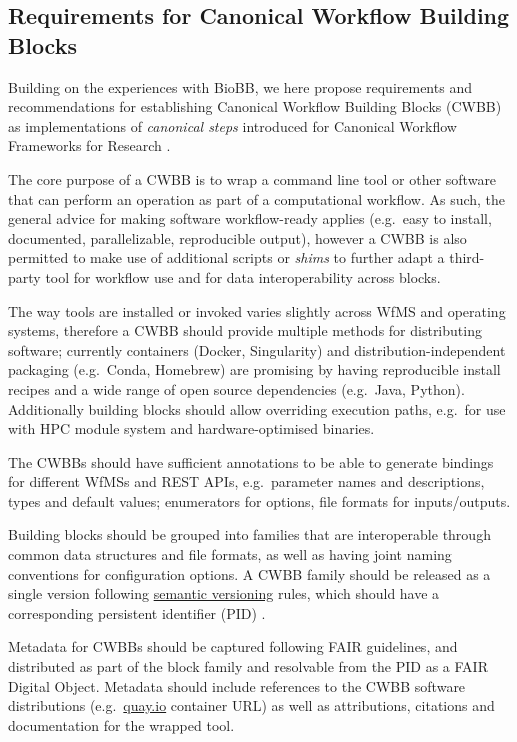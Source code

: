 \hypertarget{requirements-for-canonical-workflow-building-blocks}{%
\subsection{Requirements for Canonical Workflow Building
Blocks}\label{requirements-for-canonical-workflow-building-blocks}}

Building on the experiences with BioBB, we here propose requirements and
recommendations for establishing Canonical Workflow Building Blocks
(CWBB) as implementations of \emph{canonical steps} introduced for
Canonical Workflow Frameworks for Research \cite{ch6-36}.

The core purpose of a CWBB is to wrap a command line tool or other
software that can perform an operation as part of a computational
workflow. As such, the general advice for making software workflow-ready
applies \cite{ch6-37} (e.g.~easy to install, documented, parallelizable,
reproducible output), however a CWBB is also permitted to make use of
additional scripts or \emph{shims} to further adapt a third-party tool
for workflow use and for data interoperability across blocks.

The way tools are installed or invoked varies slightly across WfMS and
operating systems, therefore a CWBB should provide multiple methods for
distributing software; currently containers (Docker, Singularity) and
distribution-independent packaging (e.g.~Conda, Homebrew) are promising
by having reproducible install recipes and a wide range of open source
dependencies (e.g.~Java, Python). Additionally building blocks should
allow overriding execution paths, e.g.~for use with HPC module system
and hardware-optimised binaries.

The CWBBs should have sufficient annotations to be able to generate
bindings for different WfMSs and REST APIs, e.g.~parameter names and
descriptions, types and default values; enumerators for options, file
formats for inputs/outputs.

Building blocks should be grouped into families that are interoperable
through common data structures and file formats, as well as having joint
naming conventions for configuration options. A CWBB family should be
released as a single version following
\href{https://semver.org/spec/v2.0.0.html}{semantic versioning} rules,
which should have a corresponding persistent identifier (PID) \cite{McMurry 2017}.

Metadata for CWBBs should be captured following FAIR guidelines, and
distributed as part of the block family and resolvable from the PID as a
FAIR Digital Object. Metadata should include references to the CWBB
software distributions (e.g.~\href{https://quay.io/search}{quay.io}
container URL) as well as attributions, citations and documentation for
the wrapped tool.

